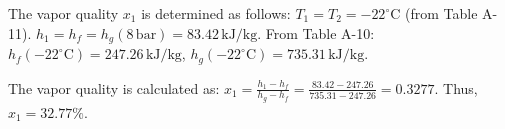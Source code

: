 The vapor quality \( x_1 \) is determined as follows:  
\( T_1 = T_2 = -22^\circ \text{C} \) (from Table A-11).  
\( h_1 = h_f = h_g(8 \, \text{bar}) = 83.42 \, \text{kJ/kg} \).  
From Table A-10:  
\( h_f(-22^\circ \text{C}) = 247.26 \, \text{kJ/kg} \),  
\( h_g(-22^\circ \text{C}) = 735.31 \, \text{kJ/kg} \).  

The vapor quality is calculated as:  
\( x_1 = \frac{h_1 - h_f}{h_g - h_f} = \frac{83.42 - 247.26}{735.31 - 247.26} = 0.3277 \).  
Thus, \( x_1 = 32.77\% \).